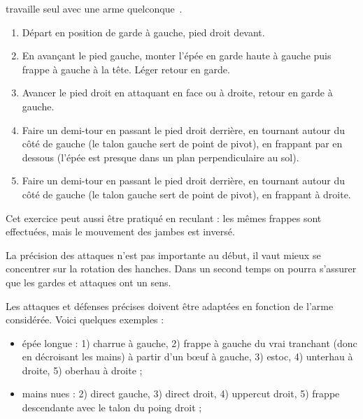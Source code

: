 \begin{exercice}


\A travaille seul avec une arme quelconque~\footnotemark{}.

\begin{enumerate}
	\item Départ en position de garde à gauche, pied droit devant.
	
	\item En avançant le pied gauche, monter l'épée en garde haute à gauche puis frappe à gauche à la tête.
	Léger retour en garde.
	
	\item Avancer le pied droit en attaquant en face ou à droite, retour en garde à gauche.
	
	\item Faire un demi-tour en passant le pied droit derrière, en tournant autour du côté de gauche (le talon gauche sert de point de pivot), en frappant par en dessous (l'épée est presque dans un plan perpendiculaire au sol).
	
	\item Faire un demi-tour en passant le pied droit derrière, en tournant autour du côté de gauche (le talon gauche sert de point de pivot), en frappant à droite.
\end{enumerate}
Cet exercice peut aussi être pratiqué en reculant : les mêmes frappes sont effectuées, mais le mouvement des jambes est inversé.

La précision des attaques n'est pas importante au début, il vaut mieux se concentrer sur la rotation des hanches.
Dans un second temps on pourra s'assurer que les gardes et attaques ont un sens.

Les attaques et défenses précises doivent être adaptées en fonction de l'arme considérée.
Voici quelques exemples :
\begin{itemize}
	\item épée longue : 1) charrue à gauche, 2) frappe à gauche du vrai tranchant (donc en décroisant les mains) à partir d'un bœuf à gauche, 3) estoc, 4) unterhau à droite, 5) oberhau à droite ;
	
	\item mains nues : 2) direct gauche, 3) direct droit, 4) uppercut droit, 5) frappe descendante avec le talon du poing droit ;
	

\end{itemize}
\end{exercice}
